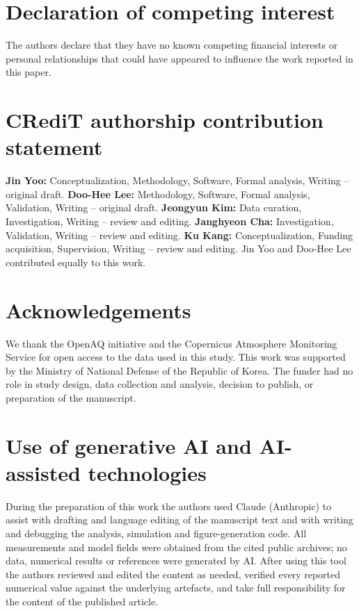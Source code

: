 \documentclass[preprint,12pt]{elsarticle}
\begin{document}


\section*{Declaration of competing interest}
The authors declare that they have no known competing financial interests or personal
relationships that could have appeared to influence the work reported in this paper.

\section*{CRediT authorship contribution statement}
\textbf{Jin Yoo:} Conceptualization, Methodology, Software, Formal analysis, Writing -- original
draft. \textbf{Doo-Hee Lee:} Methodology, Software, Formal analysis, Validation, Writing --
original draft. \textbf{Jeongyun Kim:} Data curation, Investigation, Writing -- review and
editing. \textbf{Janghyeon Cha:} Investigation, Validation, Writing -- review and editing.
\textbf{Ku Kang:} Conceptualization, Funding acquisition, Supervision, Writing -- review and
editing. Jin Yoo and Doo-Hee Lee contributed equally to this work.

\section*{Acknowledgements}
We thank the OpenAQ initiative and the Copernicus Atmosphere Monitoring Service for open access
to the data used in this study. This work was supported by the Ministry of National Defense of
the Republic of Korea. The funder had no role in study design, data collection and analysis,
decision to publish, or preparation of the manuscript.

\section*{Use of generative AI and AI-assisted technologies}
During the preparation of this work the authors used Claude (Anthropic) to assist with drafting
and language editing of the manuscript text and with writing and debugging the analysis,
simulation and figure-generation code. All measurements and model fields were obtained from the
cited public archives; no data, numerical results or references were generated by AI. After
using this tool the authors reviewed and edited the content as needed, verified every reported
numerical value against the underlying artefacts, and take full responsibility for the content
of the published article.
\end{document}
